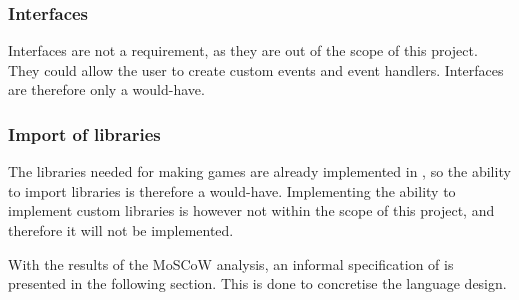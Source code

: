 \subsubsection*{Interfaces}
Interfaces are not a requirement, as they are out of the scope of this project. They could allow the user to create custom events and event handlers. Interfaces are therefore only a would-have.

\subsubsection*{Import of libraries}
The libraries needed for making games are already implemented in \lang{}, so the ability to import libraries is therefore a would-have. Implementing the ability to implement custom libraries is however not within the scope of this project, and therefore it will not be implemented.


With the results of the MoSCoW analysis, an informal specification of \lang{} is presented in the following section. This is done to concretise the language design.